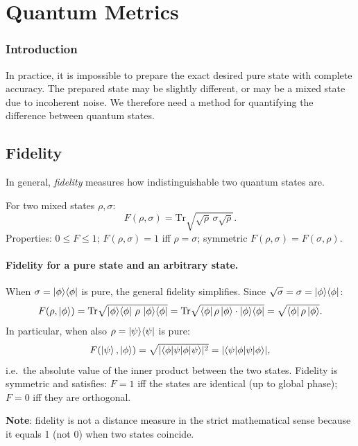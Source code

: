\documentclass[10pt,a4paper]{article}
\begin{document}
\section{Quantum Metrics}

\subsubsection*{Introduction}

In practice, it is impossible to prepare the exact desired pure state with complete accuracy. The prepared state may be slightly different, or may be a mixed state due to incoherent noise. We therefore need a method for quantifying the difference between quantum states.

\subsection{Fidelity}
In general, \textit{fidelity} measures how indistinguishable two quantum states are.

\begin{tcolorbox}[defstyle, title={Definition}]
For two mixed states $\rho,\sigma$:
\[
F(\rho,\sigma)=\mathrm{Tr}\sqrt{\sqrt{\rho}\,\sigma\sqrt{\rho}}.
\]
Properties: $0\le F\le 1$; $F(\rho,\sigma)=1$ iff $\rho=\sigma$; symmetric $F(\rho,\sigma)=F(\sigma,\rho)$.
\end{tcolorbox}

\paragraph{Fidelity for a pure state and an arbitrary state.}
When $\sigma=\ket{\phi}\!\bra{\phi}$ is pure, the general fidelity simplifies. Since $\sqrt{\sigma}=\sigma=\ket{\phi}\!\bra{\phi}$:
\[
F(\rho,\ket{\phi})
=\mathrm{Tr}\sqrt{\ket{\phi}\!\bra{\phi}\,\rho\,\ket{\phi}\!\bra{\phi}}
=\mathrm{Tr}\sqrt{\bra{\phi}\rho\ket{\phi}\cdot\ket{\phi}\!\bra{\phi}}
=\sqrt{\bra{\phi}\rho\ket{\phi}}.
\]
In particular, when also $\rho=\ket{\psi}\!\bra{\psi}$ is pure:
\[
F(\ket{\psi},\ket{\phi})
=\sqrt{|\!\braket{\phi|\psi}\!|^{2}}
=|\!\braket{\psi|\phi}\!|,
\]
i.e.\ the absolute value of the inner product between the two states.
Fidelity is symmetric and satisfies: $F=1$ iff the states are identical (up to global phase); $F=0$ iff they are orthogonal.

\textbf{Note}: fidelity is not a distance measure in the strict mathematical sense because it equals 1 (not 0) when two states coincide.
\end{document}
